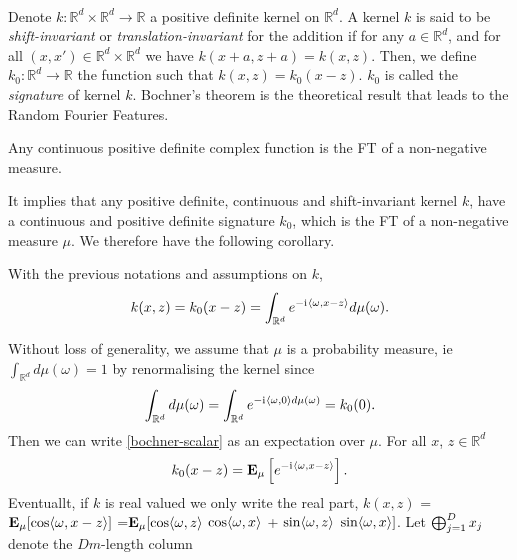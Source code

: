 \paragraph{}
Denote $k: \mathbb{R}^d \times \mathbb{R}^d \to \mathbb{R}$ a positive
definite kernel on $\mathbb{R}^d$. A kernel $k$ is said to be
\emph{shift-invariant} or \emph{translation-invariant} for the addition if for
any $a \in \mathbb{R}^d$, and for all $(x,x') \in \mathbb{R}^d \times
\mathbb{R}^d$ we have $k(x+a,z+a) = k(x,z)$.  Then, we define $k_0: \mathbb{R}^d
\to \mathbb{R}$ the function such that $k(x,z)= k_0(x-z)$. $k_0$ is
called the \emph{signature} of kernel $k$. Bochner's theorem
\cite{folland1994course} is the theoretical result that leads to the Random
Fourier Features.
\begin{theorem}\label{th:bochner-scalar}
    Any continuous positive definite complex function is the \acl{FT} of a
    non-negative measure.
\end{theorem}
It implies that any positive definite, continuous and shift-invariant kernel
$k$, have a continuous and positive definite signature $k_0$, which is the
\acl{FT} of a non-negative measure $\mu$. We therefore have the following
corollary.
\begin{corollary}\label{c:bochner-app}
    With the previous notations and assumptions on $k$,
    \begin{dmath}\label{bochner-scalar}
        k(x,z)=k_0(x-z) = \int_{\mathbb{R}^d} e^{-\iu \inner{\omega,x - z}}
        d\mu(\omega).
    \end{dmath}
\end{corollary}
Without loss of generality, we assume that $\mu$ is a probability measure,
\acs{ie} $\int_{\mathbb{R}^d} d\mu(\omega)=1$ by renormalising the kernel since
\begin{dmath*}
    \int_{\mathbb{R}^d}d\mu(\omega)= \int_{\mathbb{R}^d}e^{-\iu \inner{\omega,
    0}d\mu(\omega)}=k_0(0). 
\end{dmath*}
Then we can write \cref{bochner-scalar} as an
expectation over $\mu$. For all $x$,
$z\in\mathbb{R}^d$
\begin{dmath*}
    k_0(x-z) = \expectation_{\mu}\left[e^{-\iu \inner{\omega,x - z}}\right].
\end{dmath*}
Eventuallt, if $k$ is real valued we only write the real part, $k(x,z)$ =
${\mathbf{{E}}}_{\mu}[\cos \langle\omega,x - z\rangle]$ =${\mathbf{{E}}}_{\mu}[ \cos
\langle\omega,z\rangle$ $\cos \langle\omega,x\rangle$ + $\sin \langle\omega,z\rangle$ $\sin
\langle\omega,x\rangle]$.  Let $\operatorname*{\bigoplus}_{j=1}^D x_j$ denote the $Dm$-length column
